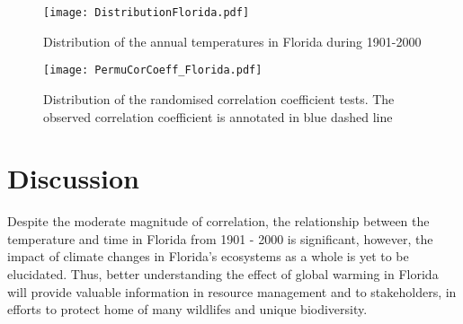 \documentclass[10pt]{article}
\begin{document}
        \begin{figure}[htbp]
        \centering
        \begin{minipage}{.4\textwidth}
        	\centering
        	\texttt{[image: DistributionFlorida.pdf]}
        	\caption{Distribution of the annual \newline temperatures in Florida during 1901-2000}
        	\label{fig:DistributionFlorida1}
        \end{minipage}%
    	\begin{minipage}{.4\textwidth}
			\centering
    		\texttt{[image: PermuCorCoeff\_Florida.pdf]}
    		\caption{Distribution of the randomised \newline correlation coefficient tests. The observed correlation coefficient is annotated in blue dashed line}
    		\label{fig:PermuCorCoeff_Florida1}
    	\end{minipage}
		\end{figure}\vspace{-1.0em}


    
\section{Discussion}
    
    Despite the moderate magnitude of correlation, the relationship between the temperature and time in Florida from 1901 - 2000 is significant, however, the impact of climate changes in Florida's ecosystems as a whole is yet to be elucidated. Thus, better understanding the effect of global warming in Florida will provide valuable information in resource management and to stakeholders, in efforts to protect home of many wildlifes and unique biodiversity. 
    
	

	
\end{document}
